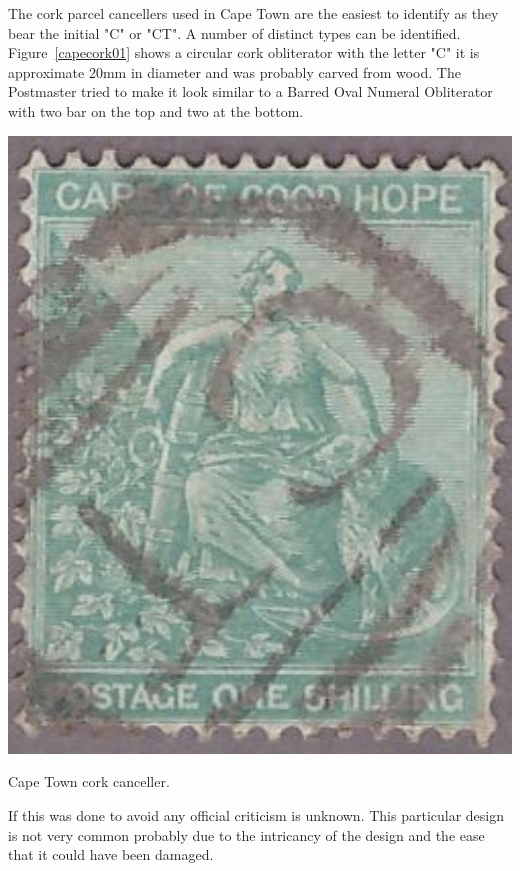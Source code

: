 The cork parcel cancellers used in Cape Town are the easiest to identify as they bear the initial "C" or "CT". A number of distinct types can be identified. Figure~\ref{capecork01}
shows a circular cork obliterator with the letter "C" it is approximate 20mm in diameter and was probably carved from wood. The Postmaster tried to make it look similar to a Barred Oval Numeral Obliterator with two bar on the top and two at the bottom. 
\begin{marginfigure}
\includegraphics[width=1.0\textwidth]{../cape-of-good-hope/cork-cape-town-01.jpg}
\caption{Cape Town cork canceller.}
\label{capecork01}
\end{marginfigure}
If this was done to avoid any official criticism is unknown. This particular design is not very common probably due to the intricancy of the design and the ease that it could have been damaged.

